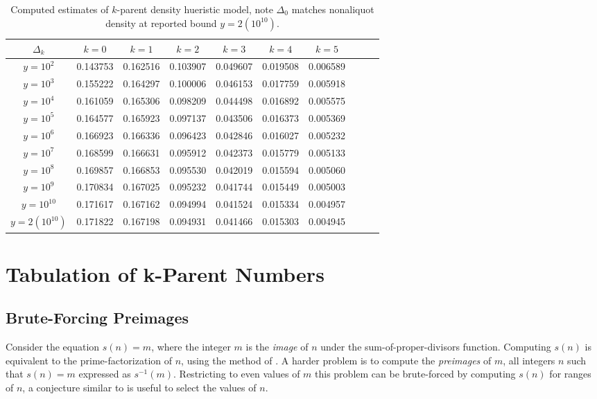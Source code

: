 \documentclass{article}
\theoremstyle{definition}
\begin{document}
\begin{table}[H]
    \centering
    \begin{tabular}{| c | c | c | c | c | c | c | c | c | c |}
        \hline
        $\Delta_k$       & $k = 0$  & $k = 1$  & $k = 2$  & $k = 3$  & $k = 4$  & $k = 5$  \\
        \hline
        $y = 10^2$       & 0.143753 & 0.162516 & 0.103907 & 0.049607 & 0.019508 & 0.006589 \\
        $y = 10^3$       & 0.155222 & 0.164297 & 0.100006 & 0.046153 & 0.017759 & 0.005918 \\
        $y = 10^4$       & 0.161059 & 0.165306 & 0.098209 & 0.044498 & 0.016892 & 0.005575 \\
        $y = 10^5$       & 0.164577 & 0.165923 & 0.097137 & 0.043506 & 0.016373 & 0.005369 \\
        $y = 10^6$       & 0.166923 & 0.166336 & 0.096423 & 0.042846 & 0.016027 & 0.005232 \\
        $y = 10^7$       & 0.168599 & 0.166631 & 0.095912 & 0.042373 & 0.015779 & 0.005133 \\
        $y = 10^8$       & 0.169857 & 0.166853 & 0.095530 & 0.042019 & 0.015594 & 0.005060 \\
        $y = 10^9$       & 0.170834 & 0.167025 & 0.095232 & 0.041744 & 0.015449 & 0.005003 \\
        $y = 10^{10}$    & 0.171617 & 0.167162 & 0.094994 & 0.041524 & 0.015334 & 0.004957 \\
        $y = 2(10^{10})$ & 0.171822 & 0.167198 & 0.094931 & 0.041466 & 0.015303 & 0.004945 \\
        \hline
    \end{tabular}
    \caption{Computed estimates of $k$-parent density hueristic model, note $\Delta_0$ matches \cite{pollPom} nonaliquot density at reported bound $y = 2(10^{10})$.}
    \label{tab:pomyang_kparent}
\end{table}

\section{Tabulation of k-Parent Numbers}
\subsection{Brute-Forcing Preimages}
Consider the equation $s(n) = m$, where the integer $m$ is the \textit{image} of $n$ under the sum-of-proper-divisors function. Computing $s(n)$ is equivalent to the prime-factorization of $n$, using the method of \cite{compute_sumdiv}. A harder problem is to compute the \textit{preimages} of $m$, all integers $n$ such that $s(n) = m$ expressed as $s^{-1}(m)$. Restricting to even values of $m$ this problem can be brute-forced by computing $s(n)$ for ranges of $n$, a conjecture similar to \cite{sumdiv_range} is useful to select the values of $n$.
\end{document}
